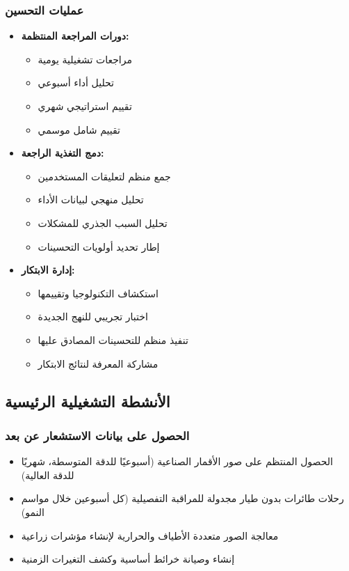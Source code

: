 \subsubsection{عمليات التحسين}
\begin{itemize}
    \item \textbf{دورات المراجعة المنتظمة:}
    \begin{itemize}
        \item مراجعات تشغيلية يومية
        \item تحليل أداء أسبوعي
        \item تقييم استراتيجي شهري
        \item تقييم شامل موسمي
    \end{itemize}
    
    \item \textbf{دمج التغذية الراجعة:}
    \begin{itemize}
        \item جمع منظم لتعليقات المستخدمين
        \item تحليل منهجي لبيانات الأداء
        \item تحليل السبب الجذري للمشكلات
        \item إطار تحديد أولويات التحسينات
    \end{itemize}
    
    \item \textbf{إدارة الابتكار:}
    \begin{itemize}
        \item استكشاف التكنولوجيا وتقييمها
        \item اختبار تجريبي للنهج الجديدة
        \item تنفيذ منظم للتحسينات المصادق عليها
        \item مشاركة المعرفة لنتائج الابتكار
    \end{itemize}
\end{itemize}

\subsection{الأنشطة التشغيلية الرئيسية}

\subsubsection{الحصول على بيانات الاستشعار عن بعد}
\begin{itemize}
    \item الحصول المنتظم على صور الأقمار الصناعية (أسبوعيًا للدقة المتوسطة، شهريًا للدقة العالية)
    \item رحلات طائرات بدون طيار مجدولة للمراقبة التفصيلية (كل أسبوعين خلال مواسم النمو)
    \item معالجة الصور متعددة الأطياف والحرارية لإنشاء مؤشرات زراعية
    \item إنشاء وصيانة خرائط أساسية وكشف التغيرات الزمنية
\end{itemize}

